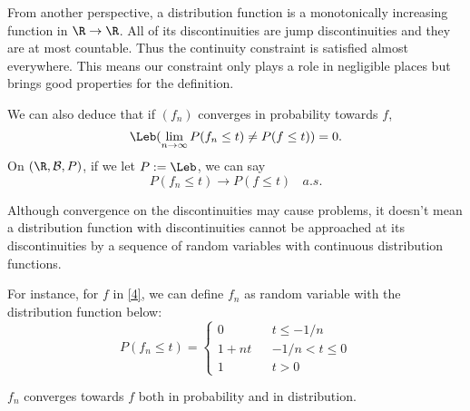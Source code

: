     From another perspective, a distribution function is a monotonically increasing function in $\R \to \R$. All of its discontinuities are jump discontinuities and they are at most countable. Thus the continuity constraint is satisfied almost everywhere. This means our constraint only plays a role in negligible places but brings good properties for the definition.
    
    We can also deduce that if $(f_n)$ converges in probability towards $f$, \[
        \Leb(\lim_{n \to \infty} P(f_n \leq t) \neq P(f \leq t)) = 0.
    \]
    On $(\R, \mathcal{B}, P)$, if we let $P := \Leb$, we can say\[
        P(f_n \leq t) \to P(f \leq t) \ \ \ \ a.s.
    \]

    \begin{remark}
        Although convergence on the discontinuities may cause problems, it doesn't mean a distribution function with discontinuities cannot be approached at its discontinuities by a sequence of random variables with continuous distribution functions.
        
        For instance, for $f$ in \cref{4}, we can define $f_n$ as random variable with the distribution function below: \[
            P(f_n \leq t) = \left\{
                \begin{array}{lcl}
                    0 & & t \leq - 1 / n \\
                    1 + nt & & - 1 / n < t \leq 0\\
                    1 & & t > 0
                \end{array}
            \right.
        \]
    \end{remark}

    $f_n$ converges towards $f$ both in probability and in distribution.
